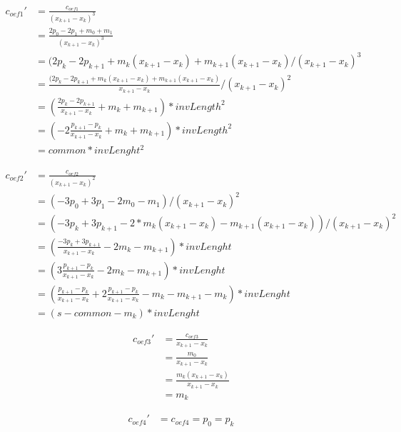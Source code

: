 \documentclass[a4paper]{article}
\begin{document}
\begin{equation*}
\begin{aligned}
	c_{oef1}' &= \frac{c_{oef1}}{(x_{k+1} - x_k)^3} \\
	&= \frac{2p_0 - 2p_1 + m_0 + m_1}{(x_{k+1} - x_k)^3}\\
	&= (2p_k - 2p_{k+1} + m_k (x_{k+1} - x_k) + m_{k+1} (x_{k+1} - x_k) / (x_{k+1} - x_k)^3 \\
	&= \frac {(2p_k - 2p_{k+1} + m_k (x_{k+1} - x_k) + m_{k+1} (x_{k+1} - x_k)}{x_{k+1} - x_k} / (x_{k+1} - x_k)^2 \\
	&= (\frac {2p_k - 2p_{k+1}}{x_{k+1} - x_k} + m_k + m_{k+1}  ) * invLength^2 \\
	&= (-2\frac {p_{k+1}- p_k}{x_{k+1} - x_k} + m_k + m_{k+1}  ) * invLength^2 \\
	&= common * invLenght^2
\end{aligned}
\end{equation*}
 
\begin{equation*}
\begin{aligned}
	c_{oef2}' &= \frac{c_{oef2}}{(x_{k+1} - x_k)^2} \\
	&= (-3p_0 + 3p_1 - 2m_0 - m_1) / (x_{k+1} - x_k)^2 \\
	&= (-3p_k + 3p_{k+1} - 2* m_k (x_{k+1} - x_k) - m_{k+1} (x_{k+1} - x_k)) / (x_{k+1} - x_k)^2 \\
	&= (\frac{-3p_k + 3p_{k+1}}{x_{k+1} - x_k} - 2m_k - m_{k+1}) * invLenght \\
	&= (3\frac{p_{k+1} - p_k}{x_{k+1} - x_k} - 2m_k - m_{k+1}) * invLenght \\
	&=(\frac{p_{k+1} - p_k}{x_{k+1} - x_k} + 2\frac{p_{k+1} - p_k}{x_{k+1} - x_k} - m_k - m_{k+1} - m_k) * invLenght \\
	&= (s - common - m_k) * invLenght  
\end{aligned}    
\end{equation*}
 
\begin{equation*}
\begin{aligned}
	c_{oef3}' &= \frac{c_{oef3}}{x_{k+1} - x_k} \\
	&= \frac{m_0}{x_{k+1} - x_k} \\
	&= \frac{m_k (x_{k+1} - x_k)}{x_{k+1} - x_k} \\
 	&= m_k
\end{aligned}
\end{equation*}

\begin{equation*}
\begin{aligned}
	c_{oef4}' &= c_{oef4} = p_0 = p_k
\end{aligned}
\end{equation*}
\end{document}
